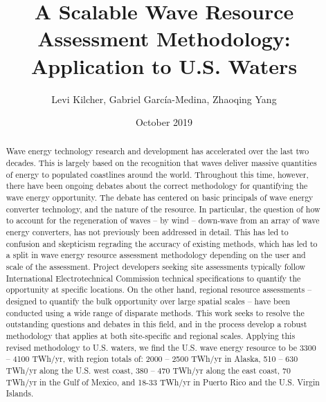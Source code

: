 \documentclass[authoryear,preprint]{elsarticle}
\title{A Scalable Wave Resource Assessment Methodology: Application to U.S. Waters}
\author{Levi Kilcher, Gabriel Garc\'ia-Medina, Zhaoqing Yang}
\date{October 2019}
\begin{document}
\begin{abstract}
Wave energy technology research and development has accelerated over the last two decades. This is largely based on the recognition that waves deliver massive quantities of energy to populated coastlines around the world. Throughout this time, however, there have been ongoing debates about the correct methodology for quantifying the wave energy opportunity. The debate has centered on basic principals of wave energy converter technology, and the nature of the resource. In particular, the question of how to account for the regeneration of waves -- by wind -- down-wave from an array of wave energy converters, has not previously been addressed in detail. This has led to confusion and skepticism regrading the accuracy of existing methods, which has led to a split in wave energy resource assessment methodology depending on the user and scale of the assessment. Project developers seeking site assessments typically follow International Electrotechnical Commission technical specifications to quantify the opportunity at specific locations. On the other hand, regional resource assessments -- designed to quantify the bulk opportunity over large spatial scales -- have been conducted using a wide range of disparate methods. This work seeks to resolve the outstanding questions and debates in this field, and in the process develop a robust methodology that applies at both site-specific and regional scales. Applying this revised methodology to U.S. waters, we find the U.S. wave energy resource to be 3300 – 4100 TWh/yr, with region totals of: 2000 – 2500 TWh/yr in Alaska, 510 – 630 TWh/yr along the U.S. west coast, 380 – 470 TWh/yr along the east coast, 70 TWh/yr in the Gulf of Mexico, and 18-33 TWh/yr in Puerto Rico and the U.S. Virgin Islands.
\end{abstract}

\maketitle


%





%
%

\clearpage



\end{document}
